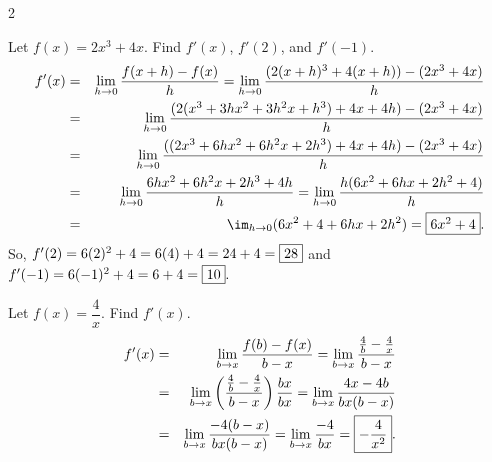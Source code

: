 \documentclass{book}
\begin{document}
\begin{Exam}
\begin{enumerate}
\begin{multicols}{2}
\begin{center}
\end{center}
\end{multicols}
\end{enumerate}
\end{Exam}\vs

\begin{Exam} Let $f(x) = 2x^3 + 4x$. Find $f'(x)$, $f'(2)$, and $f'(-1)$.\\

\begin{eqnarray*}
f'(x) &=& \lim_{h\to 0} \dfrac{f(x+h) - f(x)}{h} = \lim_{h\to 0} \dfrac{(2(x+h)^3+4(x+h)) - (2x^3+4x)}{h}\\
&=& \lim_{h\to 0} \dfrac{(2(x^3 + 3hx^2 + 3h^2x + h^3)+4x+4h) - (2x^3+4x)}{h}\\
 &=& \lim_{h\to 0} \dfrac{((2x^3 + 6hx^2 + 6h^2x + 2h^3)+4x+4h) - (2x^3+4x)}{h}\\
&=& \lim_{h\to 0} \dfrac{6hx^2 + 6h^2x + 2h^3+4h}{h} = \lim_{h\to 0} \dfrac{h(6x^2 + 6hx + 2h^2+4)}{h}\\
&=&\im_{h\to 0} (6x^2+4 + 6hx + 2h^2) = \fbox{$6x^2 + 4$}.
\end{eqnarray*} So, $f'(2) = 6(2)^2+4 = 6(4) + 4 = 24 + 4 = \fbox{28}$ and $f'(-1) = 6(-1)^2+4 = 6 +4 = \fbox{10}.$
\end{Exam}\vs

\begin{Exam} Let $f(x) = \dfrac{4}{x}$. Find $f'(x)$.\\

\begin{eqnarray*}
f'(x) &=& \lim_{b\to x} \dfrac{f(b)  - f(x)}{b-x} = \lim_{b\to x} \dfrac{\frac{4}{b} - \frac{4}{x}}{b-x}\\
&=& \lim_{b\to x} \left(\dfrac{\frac{4}{b} - \frac{4}{x}}{b-x}\right)\dfrac{bx}{bx} = \lim_{b\to x} \dfrac{4x - 4b}{bx(b-x)}\\
&=& \lim_{b\to x} \dfrac{-4(b-x)}{bx(b-x)} =\lim_{b\to x} \dfrac{-4}{bx} = \fbox{$-\dfrac{4}{x^2}$}. 
\end{eqnarray*}
\end{Exam}\vs
\end{document}

